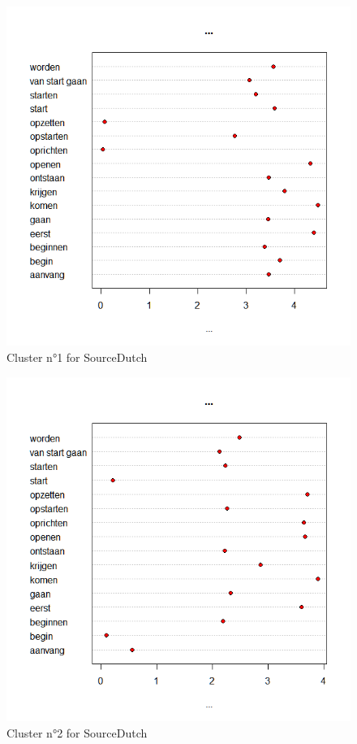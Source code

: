 \begin{figure}
\includegraphics[height=.4\textheight]{figures/Vandevoorde2-img56.png}
\caption{\label{fig:4:56}  Cluster n°1 for SourceDutch}
\end{figure}

\begin{figure}
\includegraphics[height=.4\textheight]{figures/Vandevoorde2-img57.png}
\caption{\label{fig:4:57}  Cluster n°2 for SourceDutch}
\end{figure}

